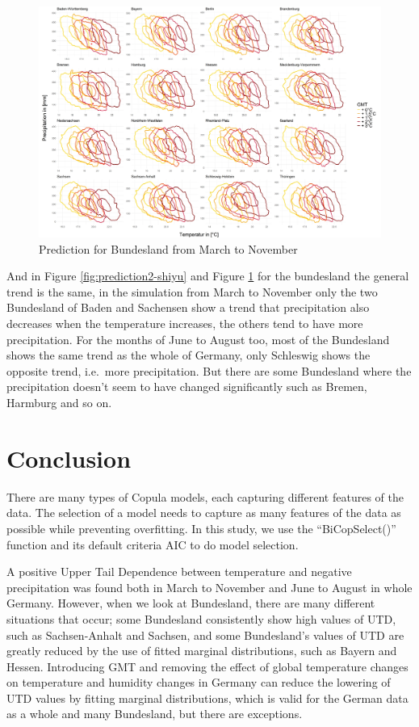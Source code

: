 \documentclass[
]{krantz}
\begin{document}
\begin{figure}

{\centering \includegraphics[width=0.8\linewidth]{work/03-compounds/figures/GMT/predictbundeslandJJA} 

}

\caption{Prediction for Bundesland from March to November}\label{fig:prediction3-shiyu}
\end{figure}

And in Figure \ref{fig:prediction2-shiyu} and Figure \ref{fig:prediction3-shiyu} for the bundesland the general trend is the same, in the simulation from March to November only the two Bundesland of Baden and Sachensen show a trend that precipitation also decreases when the temperature increases, the others tend to have more precipitation. For the months of June to August too, most of the Bundesland shows the same trend as the whole of Germany, only Schleswig shows the opposite trend, i.e.~more precipitation. But there are some Bundesland where the precipitation doesn't seem to have changed significantly such as Bremen, Harmburg and so on.

\section{Conclusion}\label{conclusion-1}

There are many types of Copula models, each capturing different features of the data. The selection of a model needs to capture as many features of the data as possible while preventing overfitting. In this study, we use the ``BiCopSelect()'' function and its default criteria AIC to do model selection.

A positive Upper Tail Dependence between temperature and negative precipitation was found both in March to November and June to August in whole Germany. However, when we look at Bundesland, there are many different situations that occur; some Bundesland consistently show high values of UTD, such as Sachsen-Anhalt and Sachsen, and some Bundesland's values of UTD are greatly reduced by the use of fitted marginal distributions, such as Bayern and Hessen. Introducing GMT and removing the effect of global temperature changes on temperature and humidity changes in Germany can reduce the lowering of UTD values by fitting marginal distributions, which is valid for the German data as a whole and many Bundesland, but there are exceptions.
\end{document}
